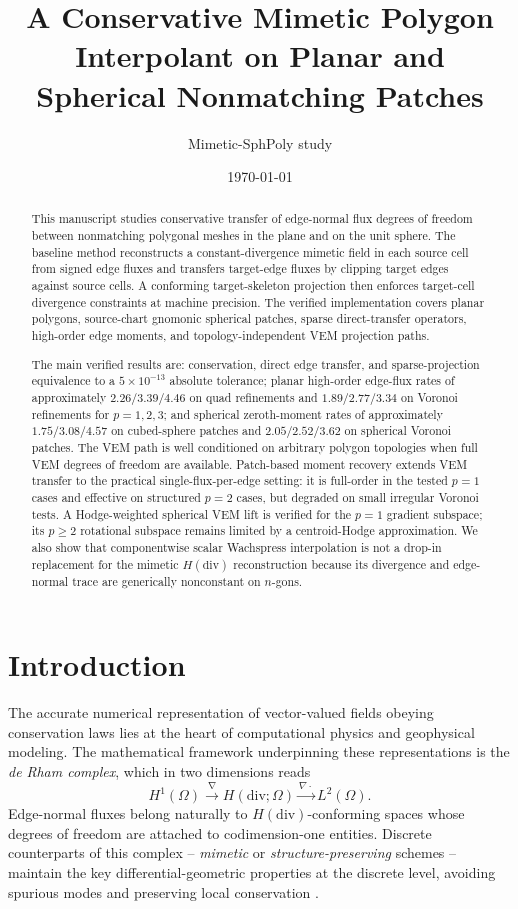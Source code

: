 \documentclass[11pt]{article}
\title{A Conservative Mimetic Polygon Interpolant on Planar and Spherical Nonmatching Patches}
\author{Mimetic-SphPoly study}
\date{\today}
\begin{document}
\maketitle

\begin{abstract}
This manuscript studies conservative transfer of edge-normal flux degrees of
freedom between nonmatching polygonal meshes in the plane and on the unit
sphere.  The baseline method reconstructs a constant-divergence mimetic field in
each source cell from signed edge fluxes and transfers target-edge fluxes by
clipping target edges against source cells.  A conforming target-skeleton
projection then enforces target-cell divergence constraints at machine
precision.  The verified implementation covers planar polygons, source-chart
gnomonic spherical patches, sparse direct-transfer operators, high-order edge
moments, and topology-independent VEM projection paths.

The main verified results are: conservation, direct edge transfer, and
sparse-projection equivalence to a \(5\times10^{-13}\) absolute tolerance;
planar high-order edge-flux rates of approximately \(2.26/3.39/4.46\) on
quad refinements and \(1.89/2.77/3.34\) on Voronoi refinements for
\(p=1,2,3\); and spherical zeroth-moment rates of approximately
\(1.75/3.08/4.57\) on cubed-sphere patches and \(2.05/2.52/3.62\) on
spherical Voronoi patches.  The VEM path is well conditioned on arbitrary
polygon topologies when full VEM degrees of freedom are available.  Patch-based
moment recovery extends VEM transfer to the practical single-flux-per-edge
setting: it is full-order in the tested \(p=1\) cases and effective on
structured \(p=2\) cases, but degraded on small irregular Voronoi tests.  A
Hodge-weighted spherical VEM lift is verified for the \(p=1\) gradient
subspace; its \(p\ge2\) rotational subspace remains limited by a
centroid-Hodge approximation.  We also show that componentwise scalar
Wachspress interpolation is not a drop-in replacement for the mimetic
\(H(\mathrm{div})\) reconstruction because its divergence and edge-normal trace
are generically nonconstant on \(n\)-gons.
\end{abstract}

\section{Introduction}

The accurate numerical representation of vector-valued fields obeying
conservation laws lies at the heart of computational physics and geophysical
modeling.  The mathematical framework underpinning these representations is
the \emph{de Rham complex}, which in two dimensions reads
\[
  H^1(\Omega) \xrightarrow{\nabla} H(\mathrm{div};\Omega)
             \xrightarrow{\nabla\cdot} L^2(\Omega).
\]
Edge-normal fluxes belong naturally to $H(\mathrm{div})$-conforming spaces
whose degrees of freedom are attached to codimension-one entities.  Discrete
counterparts of this complex -- \emph{mimetic} or \emph{structure-preserving}
schemes -- maintain the key differential-geometric properties at the discrete
level, avoiding spurious modes and preserving local conservation
\cite{BochevHyman2006,Mattiussi1997,ArnoldFalkWinther2006}.
\end{document}
